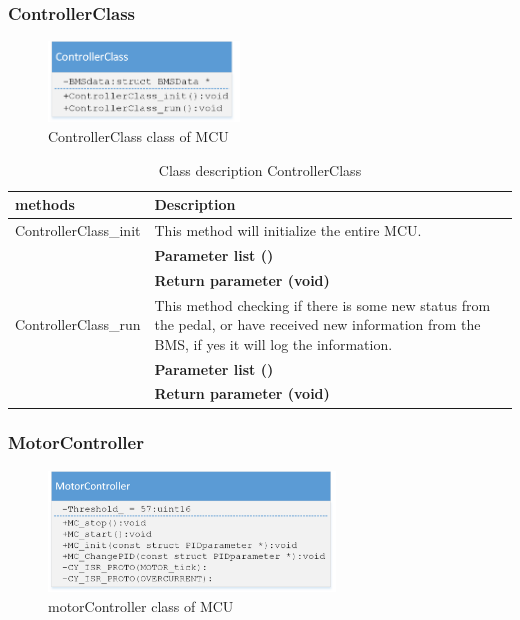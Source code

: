\subsubsection{ControllerClass}

\begin{figure}[H]
	\centering
	\includegraphics [width=2in]{Software/Pictures/class-diagram-controllerClass.png}
	\caption{ControllerClass class of MCU}
	\label{fig:Class_diagram_MCU_ControllerClass}
\end{figure}

\begin{table}[H]
	\centering
	\begin{tabular}{|p{5 cm}|p{10 cm}|}
		\hline
		\textbf{methods} & \textbf{Description} \\ \hline
		
		ControllerClass\_init
		& This method will initialize the entire MCU.
		\\ & \textbf{Parameter list ()}
		\\ & \textbf{Return parameter (void)}
		\\ \hline
		
		ControllerClass\_run
		& This method checking if there is some new status from the pedal, or have received new information from the BMS, if yes it will log the information. 
		\\ & \textbf{Parameter list ()}
		\\ & \textbf{Return parameter (void)}
		\\ \hline
		
	\end{tabular}
	\caption{Class description ControllerClass}
	\label{table:Class_description_ControllerClass_MCU}
\end{table}

\subsubsection{MotorController}

\begin{figure}[H]
	\centering
	\includegraphics [width=3in]{Software/Pictures/class-diagram-motorControllerClass.png}
	\caption{motorController class of MCU}
	\label{fig:Class_diagram_MCU_motorControllerClass}
\end{figure}

